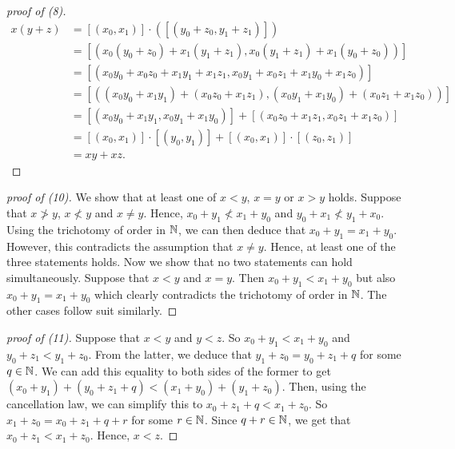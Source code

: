 \begin{proof}[proof of (8)]
    \begin{align*}
        x(y+z) &= [(x_0, x_1)] \cdot ([(y_0+ z_0, y_1 + z_1)])\\
        &= [(x_0(y_0 + z_0) + x_1(y_1 + z_1), x_0(y_1 + z_1) + x_1(y_0 + z_0))]\\
        &= [(x_0y_0 + x_0z_0 + x_1 y_1 + x_1 z_1, x_0 y_1 + x_0 z_1 + x_1 y_0 + x_1 z_0)]\\
        &= [((x_0y_0 + x_1 y_1) + (x_0 z_0 + x_1 z_1), (x_0 y_1 + x_1 y_0) + (x_0 z_1 + x_1 z_0))] \\
        &= [(x_0 y_0 + x_1 y_1, x_0 y_1 + x_1 y_0)] + [(x_0 z_0 + x_1 z_1, x_0 z_1 + x_1 z_0)] \\
        &= [(x_0, x_1)] \cdot [(y_0, y_1)] + [(x_0, x_1)] \cdot [(z_0, z_1)] \\
        &= xy + xz.
    \end{align*}
\end{proof}
\begin{proof}[proof of (10)]
    We show that at least one of \(x < y\), \(x = y\) or \(x > y\) holds. Suppose that \(x \ngtr y\), \(x \nless y\) and \(x \neq y\).
    Hence, \(x_0 + y_1 \nless x_1 + y_0\) and \(y_0 + x_1 \nless y_1 + x_0\). Using the trichotomy of order in \(\mathbb{N}\), we can then deduce that \(x_0 + y_1 = x_1 + y_0\).
    However, this contradicts the assumption that \(x \neq y\). Hence, at least one of the three statements holds. Now we show that no two statements can hold simultaneously.
    Suppose that \(x < y\) and \(x = y\). Then \(x_0 + y_1 < x_1 + y_0\) but also \(x_0 + y_1 = x_1 + y_0\) which clearly contradicts the trichotomy of order in \(\mathbb{N}\). The other cases follow suit similarly.
\end{proof}
\begin{proof}[proof of (11)]
    Suppose that \(x < y\) and \(y < z\). So \(x_0 + y_1 < x_1 + y_0\) and \(y_0 + z_1 < y_1 + z_0\). From the latter, we deduce that \(y_1 + z_0 = y_0 + z_1 + q\) for some \(q \in \mathbb{N}\).
    We can add this equality to both sides of the former to get \((x_0 + y_1) + (y_0 + z_1 + q) < (x_1 + y_0) + (y_1 + z_0)\). Then, using the cancellation law, we can simplify this to
    \(x_0 + z_1 + q < x_1 + z_0\). So \(x_1 + z_0 = x_0 + z_1 + q + r\) for some \(r \in \mathbb{N}\). Since \(q+r \in \mathbb{N}\), we get that \(x_0 + z_1 < x_1 + z_0\). Hence, \(x < z\).
\end{proof}
